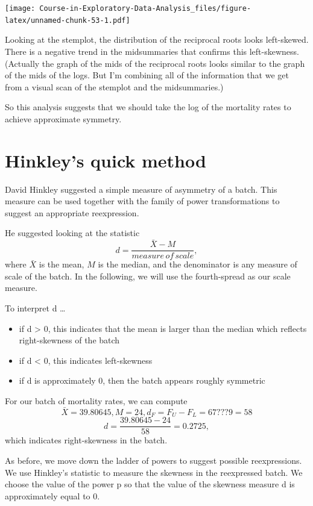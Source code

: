 \documentclass[
]{book}
\providecommand{\tightlist}{%
  \setlength{\itemsep}{0pt}\setlength{\parskip}{0pt}}
\begin{document}
\texttt{[image: Course-in-Exploratory-Data-Analysis\_files/figure-latex/unnamed-chunk-53-1.pdf]}

Looking at the stemplot, the distribution of the reciprocal roots looks left-skewed. There is a negative trend in the midsummaries that confirms this left-skewness. (Actually the graph of the mids of the reciprocal roots looks similar to the graph of the mids of the logs. But I'm combining all of the information that we get from a visual scan of the stemplot and the midsummaries.)

So this analysis suggests that we should take the log of the mortality rates to achieve approximate symmetry.

\hypertarget{hinkleys-quick-method}{%
\section{Hinkley's quick method}\label{hinkleys-quick-method}}

David Hinkley suggested a simple measure of asymmetry of a batch. This measure can be used together with the family of power transformations to suggest an appropriate reexpression.

He suggested looking at the statistic
\[
d = \frac{\bar X - M}{measure \, of \, scale},
\]
where \(\bar X\) is the mean, \(M\) is the median, and the denominator is any measure of scale of the batch. In the following, we will use the fourth-spread as our scale measure.

To interpret d \ldots{}

\begin{itemize}
\tightlist
\item
  if d \textgreater{} 0, this indicates that the mean is larger than the median which reflects right-skewness of the batch
\item
  if d \textless{} 0, this indicates left-skewness
\item
  if d is approximately 0, then the batch appears roughly symmetric
\end{itemize}

For our batch of mortality rates, we can compute
\[
 \bar X = 39.80645, M = 24,  d_F = F_U - F_L = 67 ??? 9 = 58
\]
\[
d = \frac{39.80645 - 24}{58} = 0.2725,
\]
which indicates right-skewness in the batch.

As before, we move down the ladder of powers to suggest possible reexpressions. We use Hinkley's statistic to measure the skewness in the reexpressed batch. We choose the value of the power p so that the value of the skewness measure d is approximately equal to 0.
\end{document}
